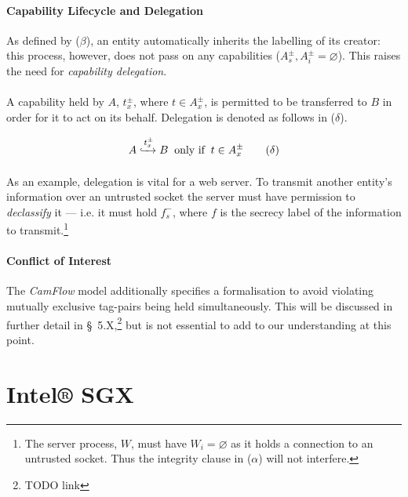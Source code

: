 \paragraph{Capability Lifecycle and Delegation} As defined by ($\beta$), an entity automatically inherits the labelling of its creator: this process, however, does not pass on any capabilities ($A_{s}^{\pm}, A_{i}^{\pm} = \varnothing$). This raises the need for \textit{capability delegation}.

\paragraph{} A capability held by $A$, $t_{x}^{\pm}$, where $t \in A_{x}^{\pm}$, is permitted to be transferred to $B$ in order for it to act on its behalf. Delegation is denoted as follows in ($\delta$).


\begin{equation}
    A \xhookrightarrow[]{t^{\pm}_{x}} B \;\; \text{only if} \;\; t \in A_{x}^{\pm} \tag{$\delta$}
\end{equation}

\paragraph{} As an example, delegation is vital for a web server. To transmit another entity's information over an untrusted socket the server must have permission to \textit{declassify} it --- i.e. it must hold $f_{s}^{-}$, where $f$ is the secrecy label of the information to transmit.\footnote{The server process, $W$, must have $W_{i} = \varnothing$ as it holds a connection to an untrusted socket. Thus the integrity clause in ($\alpha$) will not interfere.}

\paragraph{Conflict of Interest} The \textit{CamFlow} model additionally specifies a formalisation to avoid violating mutually exclusive tag-pairs being held simultaneously. This will be discussed in further detail in §~5.X,\footnote{TODO link} but is not essential to add to our understanding at this point.




\section{Intel® SGX}

